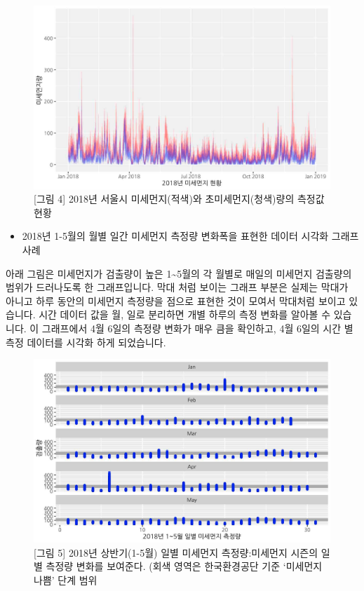 \documentclass[
  letterpaper,
]{book}
\providecommand{\tightlist}{%
  \setlength{\itemsep}{0pt}\setlength{\parskip}{0pt}}\usepackage{longtable,booktabs,array}
\begin{document}
\begin{figure}[H]

{\centering \includegraphics{img/fig4.png}

}

\caption{{[}그림 4{]} 2018년 서울시 미세먼지(적색)와
초미세먼지(청색)량의 측정값 현황}

\end{figure}%

\begin{itemize}
\tightlist
\item
  2018년 1-5월의 월별 일간 미세먼지 측정량 변화폭을 표현한 데이터 시각화
  그래프 사례
\end{itemize}

아래 그림은 미세먼지가 검출량이 높은 1\textasciitilde5월의 각 월별로
매일의 미세먼지 검출량의 범위가 드러나도록 한 그래프입니다. 막대 처럼
보이는 그래프 부분은 실제는 막대가 아니고 하루 동안의 미세먼지 측정량을
점으로 표현한 것이 모여서 막대처럼 보이고 있습니다. 시간 데이터 값을 월,
일로 분리하면 개별 하루의 측정 변화를 알아볼 수 있습니다. 이 그래프에서
4월 6일의 측정량 변화가 매우 큼을 확인하고, 4월 6일의 시간 별 측정
데이터를 시각화 하게 되었습니다.

\begin{figure}[H]

{\centering \includegraphics{img/fig5.png}

}

\caption{{[}그림 5{]} 2018년 상반기(1-5월) 일별 미세먼지 측정량:미세먼지
시즌의 일별 측정량 변화를 보여준다. (회색 영역은 한국환경공단 기준
`미세먼지 나쁨' 단계 범위}

\end{figure}%
\end{document}
